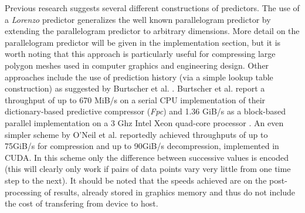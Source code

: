 Previous research suggests several different constructions of predictors. The use of a \textit{Lorenzo} predictor \cite{lindstrom2006fast,CGF:CGF681} generalizes the well known parallelogram predictor by
extending the parallelogram predictor to arbitrary dimensions. More detail on the parallelogram predictor will be given
in the implementation section, but it is worth noting that this approach is particularly useful for compressing large polygon meshes used in computer graphics and engineering design. Other approaches include the use of prediction history 
(via a simple lookup table construction) as suggested by Burtscher et al. \cite{1607248,4589203,4976448}. Burtscher et al. report a throughput of up to 670 MiB/s on a serial CPU implementation of their dictionary-based predictive 
compressor (\textit{Fpc}) and 1.36 GiB/s as a block-based parallel implementation on a 3 Ghz Intel Xeon quad-core processor \cite{4976448}. An even simpler scheme by O'Neil et al. \cite{O'Neil:2011:FDC:1964179.1964189} reportedly 
achieved throughputs of up to 75GiB/s for compression and up to 90GiB/s decompression, implemented in CUDA. In this scheme only the difference between successive values is encoded (this will clearly only work if 
pairs of data points vary very little from one time step to the next). It should be noted that the speeds achieved  are on the post-processing of results, already stored in graphics memory and thus do not include the cost of transfering 
from device to host. 

